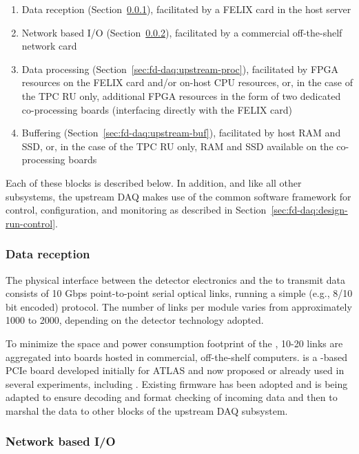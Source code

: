 \begin{enumerate}
\item Data reception (Section~\ref{sec:fd-daq:upstream-receiver}), facilitated by a FELIX card in the host server
\item Network based I/O (Section~\ref{sec:fd-daq:upstream-io}), facilitated by a commercial off-the-shelf network card
\item Data processing (Section~\ref{sec:fd-daq:upstream-proc}), facilitated by FPGA resources on the FELIX
  card and/or on-host CPU resources, or, in the case of the TPC RU only,
  additional FPGA resources in the form of two dedicated co-processing
  boards (interfacing directly with the FELIX card)
\item Buffering (Section~\ref{sec:fd-daq:upstream-buf}), facilitated by host RAM and SSD, or, in
  the case of the TPC RU only, RAM
  and SSD available on the co-processing boards
\end{enumerate}

Each of these blocks is described below.  In addition, and like all
other  subsystems, the upstream DAQ makes use of the common software framework for control, configuration, and monitoring as described in Section~\ref{sec:fd-daq:design-run-control}.

\subsubsection{Data reception}
\label{sec:fd-daq:upstream-receiver}
The physical interface between the detector electronics and the  to transmit data consists of 10 Gbps point-to-point serial optical links, running a simple (e.g., 8/10 bit encoded) protocol. 
The number of links per  module varies from approximately 1000 to 2000, depending on the detector technology adopted.

To minimize the space and power consumption footprint of the , 10-20 links are aggregated into  boards hosted in commercial, off-the-shelf computers.
 is a -based PCIe board developed initially for ATLAS and now proposed or already used in several experiments, including . 
Existing firmware has been adopted and is being adapted to ensure
decoding and format checking of incoming data and then to marshal the
data to other blocks of the upstream DAQ subsystem.

\subsubsection{Network based I/O}
\label{sec:fd-daq:upstream-io}

